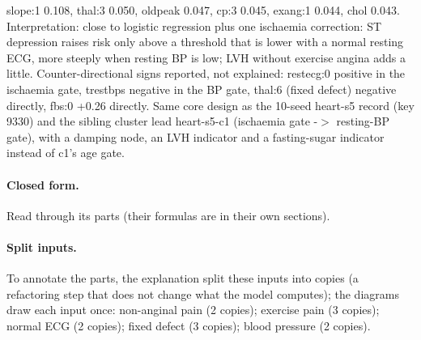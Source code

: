 \documentclass[a4paper,10pt]{article}
\newif\ifreviewmarks
\newcommand{\reviewrule}{\noindent{\color{BrickRed}\rule{\linewidth}{0.8pt}}}
\newenvironment{drafted}[1][]{%
  \ifreviewmarks\par\addvspace{\medskipamount}\reviewrule\par\nopagebreak
  \noindent{\color{BrickRed}\sffamily\footnotesize\textbf{Thesis Draft}\quad #1\hfill review}\par\nopagebreak\smallskip\fi}{%
  \ifreviewmarks\par\smallskip\noindent{\color{BrickRed}\sffamily\footnotesize end of thesis draft}\par\nopagebreak\reviewrule\par\medskip\fi}
\begin{document}
\begin{drafted}[plain-language layer: heart-s5-c2]
slope:1 0.108, thal:3 0.050, oldpeak 0.047, cp:3 0.045, exang:1 0.044, chol 0.043. Interpretation: close to logistic regression plus one ischaemia correction: ST depression raises risk only above a threshold that is lower with a normal resting ECG, more steeply when resting BP is low; LVH without exercise angina adds a little. Counter-directional signs reported, not explained: restecg:0 positive in the ischaemia gate, trestbps negative in the BP gate, thal:6 (fixed defect) negative directly, fbs:0 +0.26 directly. Same core design as the 10-seed heart-s5 record (key 9330) and the sibling cluster lead heart-s5-c1 (ischaemia gate -$>$ resting-BP gate), with a damping node, an LVH indicator and a fasting-sugar indicator instead of c1's age gate.
\paragraph{Closed form.} Read through its parts (their formulas are in their own sections).
\paragraph{Split inputs.} To annotate the parts, the explanation split these inputs into copies (a refactoring step that does not change what the model computes); the diagrams draw each input once: non-anginal pain (2 copies); exercise pain (3 copies); normal ECG (2 copies); fixed defect (3 copies); blood pressure (2 copies).

\end{drafted}
\end{document}
